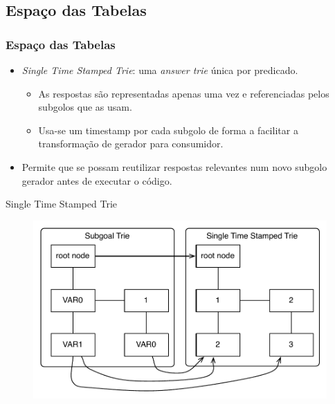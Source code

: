 \documentclass{beamer}
\begin{document}
\subsection{Espaço das Tabelas}
\begin{frame}
   \frametitle{Espaço das Tabelas}
   \begin{itemize}
      \item \emph{Single Time Stamped Trie}: uma \emph{answer trie} única por predicado.
      \begin{itemize}
         \item As respostas são representadas apenas uma vez e referenciadas pelos subgolos que as usam.
         \item Usa-se um timestamp por cada subgolo de forma a facilitar a transformação de gerador para consumidor.
      \end{itemize}
      \item<2-> Permite que se possam reutilizar respostas relevantes num novo subgolo gerador antes de executar
      o código.
   \end{itemize}
   \begin{block}{Single Time Stamped Trie}
     \begin{figure}[ht]
       \centering
         \includegraphics[scale=0.37]{stst.pdf}
     \end{figure}
   \end{block}
\end{frame}
\end{document}
